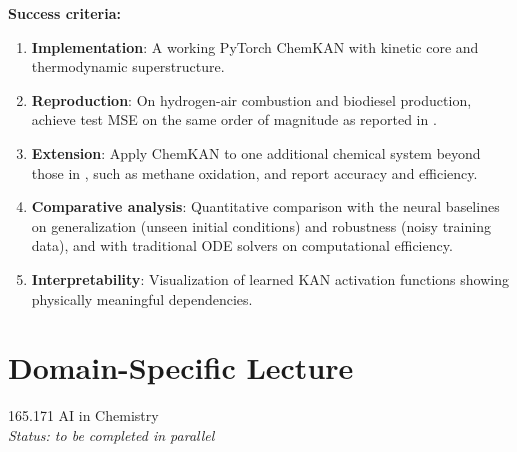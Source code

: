 \documentclass[11pt,a4paper]{article}
\begin{document}
\smallskip
\noindent\textbf{Success criteria:}
\begin{enumerate}
  \item \textbf{Implementation}: A working PyTorch ChemKAN with kinetic core and thermodynamic superstructure.
  
  \item \textbf{Reproduction}: On hydrogen-air combustion and biodiesel production, achieve test MSE on the same order of magnitude as reported in \cite{Koenig_2025}.

  \item \textbf{Extension}: Apply ChemKAN to one additional chemical system beyond those in \cite{Koenig_2025}, such as methane oxidation, and report accuracy and efficiency.

  \item \textbf{Comparative analysis}: Quantitative comparison with the neural baselines on generalization (unseen initial conditions) and robustness (noisy training data), and with traditional ODE solvers on computational efficiency.

  \item \textbf{Interpretability}: Visualization of learned KAN activation functions showing physically meaningful dependencies.
\end{enumerate}

\smallskip

\section*{Domain-Specific Lecture}

165.171 AI in Chemistry \\
\textit{Status: to be completed in parallel}

\printbibliography
\end{document}
